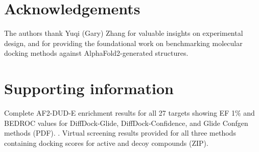 \documentclass[letterpaper]{article}
\newcommand{\lh}[1]{{\color{blue}{#1}}}
\begin{document}
\section*{Acknowledgements}
The authors thank Yuqi (Gary) Zhang for valuable insights on experimental design, and for providing the foundational work on benchmarking molecular docking methods against AlphaFold2-generated structures.

\section*{Supporting information}
Complete AF2-DUD-E enrichment results for all 27 targets showing EF 1\% and BEDROC values for DiffDock-Glide, DiffDock-Confidence, and Glide Confgen methods (PDF). \lh {Sensitivity analysis of the binding site conditioning parameter $\gamma$ (PDF)}. Virtual screening results provided for all three methods containing docking scores for active and decoy compounds (ZIP). 



\end{document}
